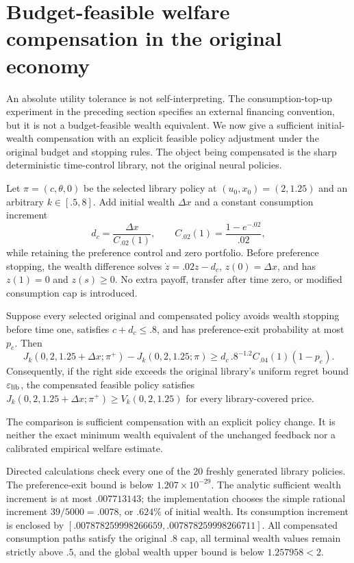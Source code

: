 \section{Budget-feasible welfare compensation in the original economy}\label{sec:wealthcompensation}
An absolute utility tolerance is not self-interpreting. The consumption-top-up experiment in the preceding section specifies an external financing convention, but it is not a budget-feasible wealth equivalent. We now give a sufficient initial-wealth compensation with an explicit feasible policy adjustment under the original budget and stopping rules. The object being compensated is the sharp deterministic time-control library, not the original neural policies.

Let $\pi=(c,\theta,0)$ be the selected library policy at $(u_0,x_0)=(2,1.25)$ and an arbitrary $k\in[.5,8]$. Add initial wealth $\Delta x$ and a constant consumption increment
\[
 d_c=\frac{\Delta x}{C_{.02}(1)},\qquad C_{.02}(1)=\frac{1-e^{-.02}}{.02},
\]
while retaining the preference control and zero portfolio. Before preference stopping, the wealth difference solves $\dot z=.02z-d_c$, $z(0)=\Delta x$, and has $z(1)=0$ and $z(s)\geq0$. No extra payoff, transfer after time zero, or modified consumption cap is introduced.

\begin{proposition}\label{prop:wealthcompensation}
Suppose every selected original and compensated policy avoids wealth stopping before time one, satisfies $c+d_c\leq.8$, and has preference-exit probability at most $p_e$. Then
\begin{equation}
 J_k(0,2,1.25+\Delta x;\pi^+)-J_k(0,2,1.25;\pi)
 \geq d_c\,.8^{-1.2}C_{.04}(1)(1-p_e).\label{eq:wealthgain}
\end{equation}
Consequently, if the right side exceeds the original library's uniform regret bound $\varepsilon_{\rm lib}$, the compensated feasible policy satisfies
$J_k(0,2,1.25+\Delta x;\pi^+)\geq V_k(0,2,1.25)$ for every library-covered price.
\end{proposition}
The comparison is sufficient compensation with an explicit policy change. It is neither the exact minimum wealth equivalent of the unchanged feedback nor a calibrated empirical welfare estimate.

Directed calculations check every one of the 20 freshly generated library policies. The preference-exit bound is below $1.207\times10^{-29}$. The analytic sufficient wealth increment is at most $.007713143$; the implementation chooses the simple rational increment $39/5000=.0078$, or $.624\%$ of initial wealth. Its consumption increment is enclosed by $[.007878259998266659,.007878259998266711]$. All compensated consumption paths satisfy the original $.8$ cap, all terminal wealth values remain strictly above $.5$, and the global wealth upper bound is below $1.257958<2$.

